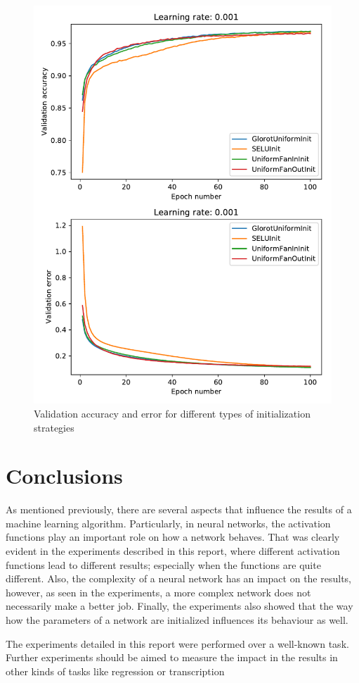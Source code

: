 \documentclass{article}
\begin{document}
\begin{figure}[tb]
\vskip 5mm
\begin{center}
\centerline{\includegraphics[width=\columnwidth]{validation_acc_err_init}}
\caption{Validation accuracy and error for different types of initialization strategies}
\label{fig:sample-graph}
\end{center}
\vskip -5mm
\end{figure}


\section{Conclusions}
\label{sec:concl}
As mentioned previously, there are several aspects that influence the results of a machine learning algorithm. Particularly, in neural networks, the activation functions play an important role on how a network behaves. That was clearly evident in the experiments described in this report, where different activation functions lead to different results; especially when the functions are quite different. Also, the complexity of a neural network has an impact on the results, however, as seen in the experiments, a more complex network does not necessarily make a better job. Finally, the experiments also showed that the way how the parameters of a network are initialized influences its behaviour as well.

The experiments detailed in this report were performed over a well-known task. Further experiments should be aimed to measure the impact in the results in other kinds of tasks like regression or transcription



\end{document}
